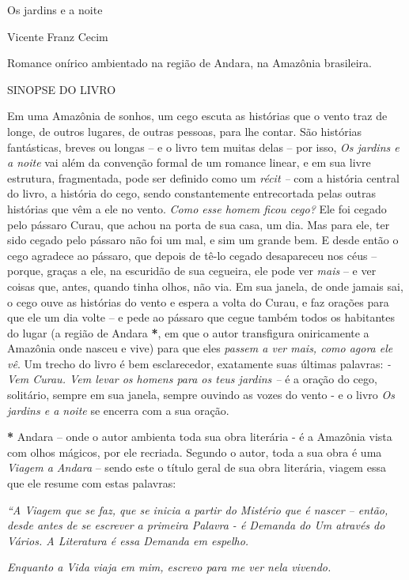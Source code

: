 Os jardins e a noite

Vicente Franz Cecim

Romance onírico ambientado na região de Andara, na Amazônia brasileira.

SINOPSE DO LIVRO

Em uma Amazônia de sonhos, um cego escuta as histórias que o vento traz
de longe, de outros lugares, de outras pessoas, para lhe contar. São
histórias fantásticas, breves ou longas -- e o livro tem muitas delas --
por isso, \emph{Os jardins e a noite} vai além da convenção formal de um
romance linear, e em sua livre estrutura, fragmentada, pode ser definido
como um \emph{récit --} com a história central do livro, a história do
cego, sendo constantemente entrecortada pelas outras histórias que vêm a
ele no vento. \emph{Como esse homem ficou cego?} Ele foi cegado pelo
pássaro Curau, que achou na porta de sua casa, um dia. Mas para ele, ter
sido cegado pelo pássaro não foi um mal, e sim um grande bem. E desde
então o cego agradece ao pássaro, que depois de tê-lo cegado desapareceu
nos céus -- porque, graças a ele, na escuridão de sua cegueira, ele pode
ver \emph{mais} -- e ver coisas que, antes, quando tinha olhos, não via.
Em sua janela, de onde jamais sai, o cego ouve as histórias do vento e
espera a volta do Curau, e faz orações para que ele um dia volte -- e
pede ao pássaro que cegue também todos os habitantes do lugar (a região
de Andara \textbf{*}, em que o autor transfigura oniricamente a Amazônia
onde nasceu e vive) para que eles \emph{passem a ver mais, como agora
ele vê}. Um trecho do livro é bem esclarecedor, exatamente suas últimas
palavras: \emph{- Vem Curau. Vem levar os homens para os teus jardins
--} é a oração do cego, solitário, sempre em sua janela, sempre ouvindo
as vozes do vento - e o livro \emph{Os jardins e a noite} se encerra com
a sua oração.

\textbf{*} Andara -- onde o autor ambienta toda sua obra literária - é a
Amazônia vista com olhos mágicos, por ele recriada. Segundo o autor,
toda a sua obra é uma \emph{Viagem a Andara} -- sendo este o título
geral de sua obra literária, viagem essa que ele resume com estas
palavras:

\emph{``A Viagem que se faz, que se inicia a partir do Mistério que é
nascer -- então, desde antes de se escrever a primeira Palavra - é
Demanda do Um através do Vários. A Literatura é essa Demanda em espelho.
}

\emph{Enquanto a Vida viaja em mim, escrevo para me ver nela vivendo.}

